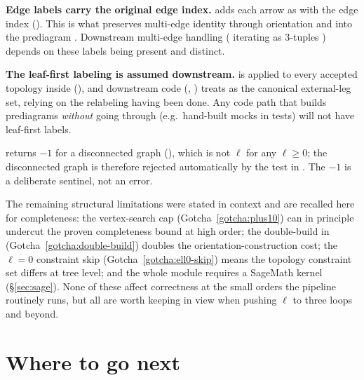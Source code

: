 \begin{gotcha}
\label{gotcha:edgelabels}
\textbf{Edge labels carry the original edge index.}  adds each
arrow as  with  the edge index
(). This is what preserves multi-edge
identity through orientation and into the prediagram . Downstream
multi-edge handling ( iterating  as 3-tuples
) depends on these labels being present and distinct.
\end{gotcha}

\begin{gotcha}
\label{gotcha:leaffirst}
\textbf{The leaf-first labeling is assumed downstream.} 
is applied to every accepted topology inside 
(), and downstream code
(, ) treats  as the
canonical external-leg set, relying on the relabeling having been done. Any code
path that builds prediagrams \emph{without} going through
 (e.g.\ hand-built mocks in tests) will not have
leaf-first labels.
\end{gotcha}

\begin{gotcha}
\label{gotcha:sentinel}
 returns $-1$ for a disconnected graph
(), which is not $\ell$ for any
$\ell\ge 0$; the disconnected graph is therefore rejected automatically by the
 test in . The $-1$ is a deliberate
sentinel, not an error.
\end{gotcha}

The remaining structural limitations were stated in context and are recalled here
for completeness: the  vertex-search cap (Gotcha~\ref{gotcha:plus10})
can in principle undercut the proven completeness bound at high order; the
double-build in  (Gotcha~\ref{gotcha:double-build})
doubles the orientation-construction cost; the $\ell=0$ constraint skip
(Gotcha~\ref{gotcha:ell0-skip}) means the topology constraint set differs at tree
level; and the whole module requires a SageMath kernel (\S\ref{sec:sage}). None of
these affect correctness at the small orders the pipeline routinely runs, but all
are worth keeping in view when pushing $\ell$ to three loops and beyond.

\section{Where to go next}

